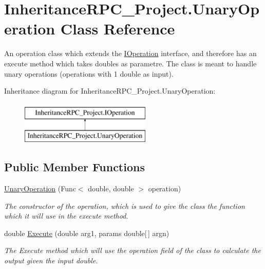 \hypertarget{class_inheritance_r_p_c___project_1_1_unary_operation}{\section{Inheritance\+R\+P\+C\+\_\+\+Project.\+Unary\+Operation Class Reference}
\label{class_inheritance_r_p_c___project_1_1_unary_operation}
}


An operation class which extends the \hyperlink{interface_inheritance_r_p_c___project_1_1_i_operation}{I\+Operation} interface, and therefore has an execute method which takes doubles as parametre. The class is meant to handle unary operations (operations with 1 double as input).  


Inheritance diagram for Inheritance\+R\+P\+C\+\_\+\+Project.\+Unary\+Operation\+:\begin{figure}[H]
\begin{center}
\leavevmode
\includegraphics[height=2.000000cm]{class_inheritance_r_p_c___project_1_1_unary_operation}
\end{center}
\end{figure}
\subsection*{Public Member Functions}
\begin{DoxyCompactItemize}
\item 
\hyperlink{class_inheritance_r_p_c___project_1_1_unary_operation_abc91765e8e1775675d6b9f12747ad056}{Unary\+Operation} (Func$<$ double, double $>$ operation)
\begin{DoxyCompactList}\small\item\em The constructor of the operation, which is used to give the class the function which it will use in the execute method. \end{DoxyCompactList}\item 
double \hyperlink{class_inheritance_r_p_c___project_1_1_unary_operation_af5f32626af010e981e3e08aab753a61c}{Execute} (double arg1, params double\mbox{[}$\,$\mbox{]} argn)
\begin{DoxyCompactList}\small\item\em The Execute method which will use the operation field of the class to calculate the output given the input double. \end{DoxyCompactList}\end{DoxyCompactItemize}


